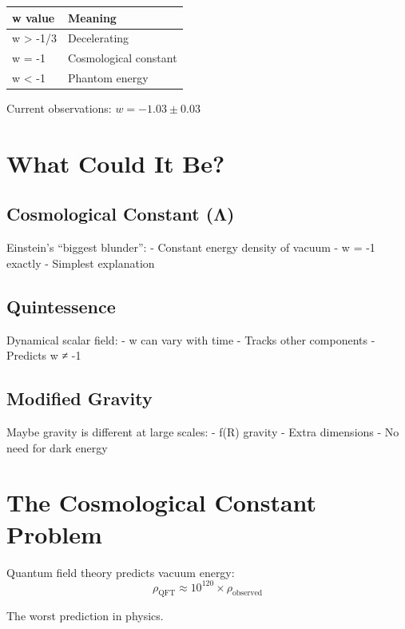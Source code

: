\documentclass[
  11pt,
  letterpaper,
  twoside,
  openright]{book}
\begin{document}
\begin{longtable}[]{@{}ll@{}}
\toprule\noalign{}
w value & Meaning \\
\midrule\noalign{}
\endhead
\bottomrule\noalign{}
\endlastfoot
w \textgreater{} -1/3 & Decelerating \\
w = -1 & Cosmological constant \\
w \textless{} -1 & Phantom energy \\
\end{longtable}

Current observations: \(w = -1.03 \pm 0.03\)

\section{What Could It Be?}\label{what-could-it-be}

\subsection{Cosmological Constant
(Λ)}\label{cosmological-constant-ux3bb}

Einstein's ``biggest blunder'': - Constant energy density of vacuum - w
= -1 exactly - Simplest explanation

\subsection{Quintessence}\label{quintessence}

Dynamical scalar field: - w can vary with time - Tracks other components
- Predicts w ≠ -1

\subsection{Modified Gravity}\label{modified-gravity}

Maybe gravity is different at large scales: - f(R) gravity - Extra
dimensions - No need for dark energy

\section{The Cosmological Constant
Problem}\label{the-cosmological-constant-problem}

Quantum field theory predicts vacuum energy: \[
\rho_{\text{QFT}} \approx 10^{120} \times \rho_{\text{observed}}
\]

The worst prediction in physics.
\end{document}
